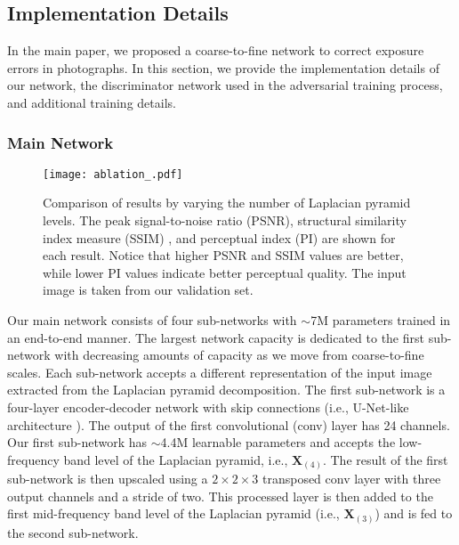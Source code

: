 \documentclass[final]{cvpr}
\begin{document}
\subsection{Implementation Details}\label{sec:implementation_details}


In the main paper, we proposed a coarse-to-fine network to correct exposure errors in photographs. In this section, we provide the implementation details of our network, the discriminator network used in the adversarial training process, and additional training details. 

\subsubsection{Main Network}



\begin{figure*}[t]
\centering
\texttt{[image: ablation\_.pdf]}
\vspace{-7mm}
\caption{Comparison of results by varying the number of Laplacian pyramid levels. 
The peak signal-to-noise ratio (PSNR), structural similarity index measure (SSIM) \cite{wang2004image}, and perceptual index (PI) \cite{blau20182018} are shown for each result. Notice that higher PSNR and SSIM values are better, while lower PI values indicate better perceptual quality. The input image is taken from our validation set.\vspace{-2mm}}
\label{fig:ablation1}
\end{figure*}

Our main network consists of four sub-networks with $\sim$7M parameters trained in an end-to-end manner. The largest network capacity is dedicated to the first sub-network with decreasing amounts of capacity as we move from coarse-to-fine scales. Each sub-network accepts a different representation of the input image extracted from the Laplacian pyramid decomposition. The first sub-network is a four-layer encoder-decoder network with skip connections (i.e., U-Net-like architecture  \cite{unet}). The output of the first convolutional (conv) layer has 24 channels. Our first sub-network has $\sim$4.4M learnable parameters and accepts the low-frequency band level of the Laplacian pyramid, i.e., $\mathbf{X}_{(4)}$. The result of the first sub-network is then upscaled using a $2\!\times\!2\!\times\!3$ transposed conv layer with three output channels and a stride of two. This processed layer is then added to the first mid-frequency band level of the Laplacian pyramid (i.e., $\mathbf{X}_{(3)}$) and is fed to the second sub-network. 
\end{document}
